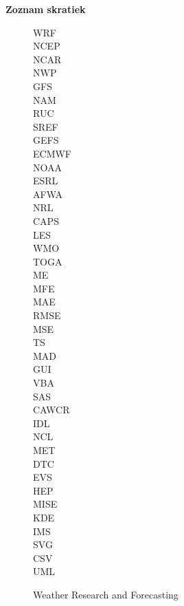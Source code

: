 \eject
\begin{Huge}
\noindent\textbf{Zoznam skratiek} 
\end{Huge}


\begin{figure}[!h]
		\bigskip
		\bigskip
		\hspace{0.5cm}
		\begin{minipage}[h]{0.1\textwidth}
		  WRF \\
		  NCEP \\
		  NCAR \\
		  NWP \\
		  GFS \\
		  NAM \\
		  RUC \\
		  SREF \\
		  GEFS \\
		  ECMWF \\
		  NOAA \\
		  ESRL \\
		  AFWA \\
		  NRL \\
		  CAPS \\
		  LES \\
		  WMO \\
		  TOGA \\
		  ME \\
		  MFE \\
		  MAE \\
		  RMSE \\
		  MSE \\
		  TS \\
		  MAD \\
		  GUI \\
		  VBA \\
		  SAS \\
		  CAWCR \\
		  IDL \\
		  NCL \\
		  MET \\
		  DTC \\
		  EVS \\
		  HEP \\
		  MISE \\
		  KDE \\
		  IMS \\
		  SVG \\
		  CSV \\
		  UML 
		\end{minipage}
		\begin{minipage}[h]{0.8\textwidth}
		  Weather Research and Forecasting \\

\end{minipage}
\end{figure}
